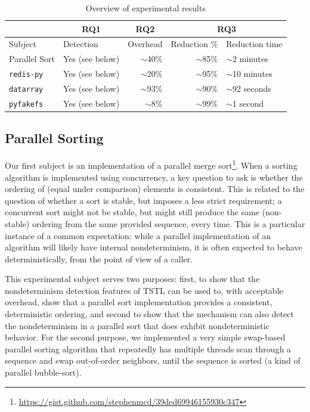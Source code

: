 \begin{table}
  \centering
  {\scriptsize
\begin{tabular}{l|l|r|r|l}
& \multicolumn{1}{c}{\bf RQ1} & \multicolumn{1}{|c|}{\bf RQ2} &
                                                              \multicolumn{2}{c}{\bf RQ3}\\
  \hline
Subject & Detection & Overhead & Reduction \%
                                                        & Reduction time\\
\hline
Parallel Sort & Yes (see below) & $\sim$40\% & $\sim$85\% & $\sim$2 minutes\\
{\tt redis-py} & Yes (see below) & $\sim$20\% & $\sim$95\% & $\sim$10 minutes\\
{\tt datarray} & Yes (see below) & $\sim$93\% & $\sim$90\% & $\sim$92
  seconds\\
{\tt pyfakefs} & Yes (see below) & $\sim$8\% & $\sim$99\% & $\sim$1 second  \\
\end{tabular}
}
\caption{Overview of experimental results}
\label{tab:overviewexp}
\end{table}

\subsection{Parallel Sorting}

Our first subject is an implementation of a parallel merge
sort\footnote{\url{https://gist.github.com/stephenmcd/39ded69946155930c347}}. When a sorting
algorithm is implemented using concurrency, a key question to ask is
whether the ordering of (equal under comparison) elements is consistent.
This is related to the question of whether a sort is stable,
but imposes a less strict requirement; a concurrent sort
might not be stable, but might still produce the same (non-stable)
ordering from the same provided sequence, every time.  This is a
particular instance of a common expectation:  while a parallel
implementation of an algorithm will likely have internal
nondeterminism, it is often expected to
behave deterministically, from the point of view of a caller.

This experimental subject serves two purposes:  first, to show that the
nondeterminism detection features of TSTL can be used to, with
acceptable overhead, show that a parallel sort implementation provides
a consistent, deterministic ordering, and second to show that the
mechanism can also detect the nondeterminism in a parallel sort that
does exhibit nondeterministic behavior.  For the second purpose, we
implemented a very simple swap-based parallel sorting algorithm that
repeatedly has multiple threads scan through a sequence and swap
out-of-order neighbors, until the sequence is sorted (a kind of
parallel bubble-sort).

